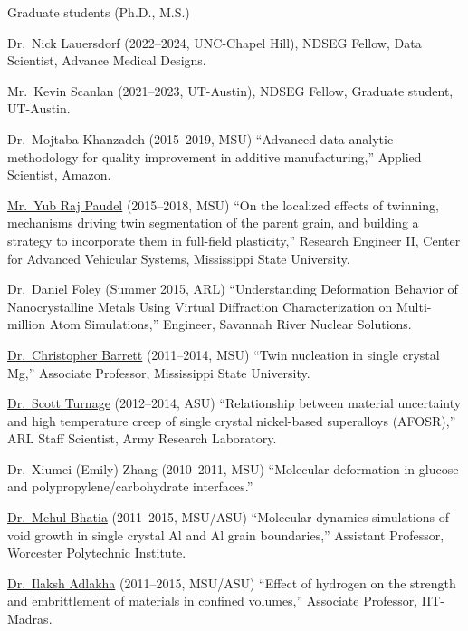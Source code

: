 Graduate students (Ph.D., M.S.)

\begin{list2}
\vspace*{.05in}
\item
Dr.~Nick Lauersdorf (2022--2024, UNC-Chapel Hill), NDSEG Fellow, Data Scientist, Advance Medical Designs.
\item
Mr.~Kevin Scanlan (2021--2023, UT-Austin), NDSEG Fellow, Graduate student, UT-Austin.
\item
{Dr.~Mojtaba Khanzadeh} (2015--2019, MSU) ``Advanced data analytic methodology for quality improvement in additive manufacturing,'' Applied Scientist, Amazon.
\item
\href{https://scholar.google.com/citations?hl=en&user=feOs0wcAAAAJ}{Mr.~Yub Raj Paudel} (2015--2018, MSU) ``On the localized effects of twinning, mechanisms driving twin segmentation of the parent grain, and building a strategy to incorporate them in full-field plasticity,'' Research Engineer II, Center for Advanced Vehicular Systems, Mississippi State University.
\item
Dr.~Daniel Foley (Summer 2015, ARL) ``Understanding Deformation Behavior of Nanocrystalline Metals Using Virtual Diffraction Characterization on Multi-million Atom Simulations,'' Engineer, Savannah River Nuclear Solutions.
\item
\href{http://scholar.google.com/citations?user=DMtfKn0AAAAJ&hl=en}{Dr.~Christopher Barrett} (2011--2014, MSU) ``Twin nucleation in single crystal Mg,'' Associate Professor, Mississippi State University.
\item
\href{https://www.researchgate.net/profile/Scott_Turnage}{Dr.~Scott Turnage} (2012--2014, ASU) ``Relationship between material uncertainty and high temperature creep of single crystal nickel-based superalloys (AFOSR),'' ARL Staff Scientist, Army Research Laboratory.
\item
Dr.~Xiumei (Emily) Zhang (2010--2011, MSU) ``Molecular deformation in glucose and polypropylene/carbohydrate interfaces.''
\item
\href{http://scholar.google.com/citations?user=MjAcNi8AAAAJ&hl=en}{Dr.~Mehul Bhatia} (2011--2015, MSU/ASU) ``Molecular dynamics simulations of void growth in single crystal Al and Al grain boundaries,'' Assistant Professor, Worcester Polytechnic Institute.
\item
\href{http://scholar.google.com/citations?user=l-oMnVsAAAAJ&hl=en}{Dr.~Ilaksh Adlakha} (2011--2015, MSU/ASU) ``Effect of hydrogen on the strength and embrittlement of materials in confined volumes,'' Associate Professor, IIT-Madras.

\end{list2}
